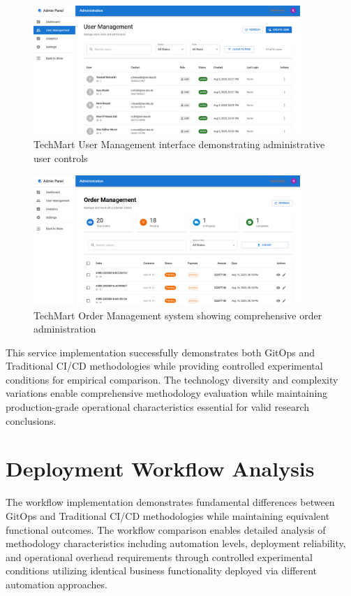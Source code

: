 \begin{figure}[H]
\centering
\includegraphics[width=0.9\textwidth]{figures/chapter5/techmart-user-management.png}
\caption{TechMart User Management interface demonstrating administrative user controls}
\label{fig:techmart-user-management}
\end{figure}

\begin{figure}[H]
\centering
\includegraphics[width=0.9\textwidth]{figures/chapter5/techmart-order-management.png}
\caption{TechMart Order Management system showing comprehensive order administration}
\label{fig:techmart-order-management}
\end{figure}

This service implementation successfully demonstrates both GitOps and Traditional CI/CD methodologies while providing controlled experimental conditions for empirical comparison. The technology diversity and complexity variations enable comprehensive methodology evaluation while maintaining production-grade operational characteristics essential for valid research conclusions.

\section{Deployment Workflow Analysis}

The workflow implementation demonstrates fundamental differences between GitOps and Traditional CI/CD methodologies while maintaining equivalent functional outcomes. The workflow comparison enables detailed analysis of methodology characteristics including automation levels, deployment reliability, and operational overhead requirements through controlled experimental conditions utilizing identical business functionality deployed via different automation approaches.

